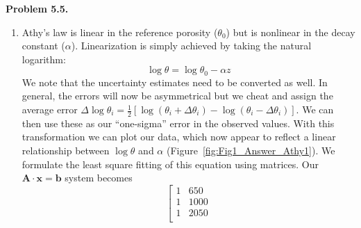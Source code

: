 \noindent
\bf{Problem 5.5.} \\
\begin{enumerate}[label=\alph*)]
\item Athy's law is linear in the reference porosity ($\theta_0$) but is nonlinear in the decay constant ($\alpha$).
Linearization is simply achieved by taking the natural logarithm:
$$
\log \theta = \log \theta_0 - \alpha z
$$
We note that the uncertainty estimates need to be converted as well.  In general, the errors will now be asymmetrical but we cheat and assign
the average error $\Delta \log \theta_i = \frac{1}{2}[\log(\theta_i+\Delta \theta_i) - \log(\theta_i-\Delta \theta_i)]$.  We can then use these
as our ``one-sigma'' error in the observed values.
With this transformation we can plot our data, which now appear to reflect a linear relationship between $\log \theta$ and $\alpha$ (Figure~\ref{fig:Fig1_Answer_Athy1}).
We formulate the least square fitting of this equation using matrices.  Our $\mathbf{A\cdot x} = \mathbf{b}$ system becomes
\[\left[ {\begin{array}{*{20}{c}}
1&{650}\\
1&{1000}\\
1&{2050}\\

\end{array}}\]
\end{enumerate}
